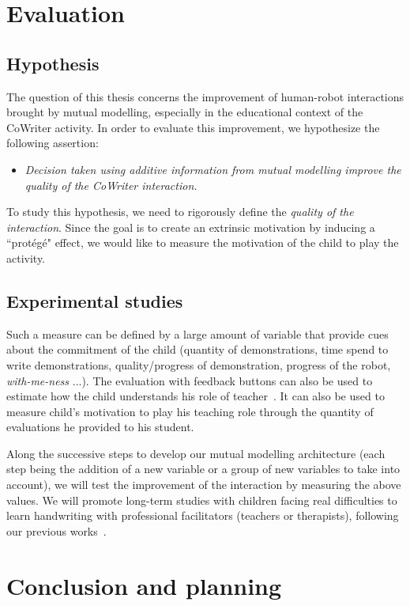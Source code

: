 \documentclass[10pt,a4paper,twocolumn]{article}
\begin{document}
\section{Evaluation}

\subsection{Hypothesis}

The question of this thesis concerns the improvement of human-robot interactions brought by mutual modelling, especially in the educational context of the CoWriter activity. In order to evaluate this improvement, we hypothesize the following assertion:
\begin{itemize}
\item \textit{Decision taken using additive information from mutual modelling improve the quality of the CoWriter interaction.}
\end{itemize}
To study this hypothesis, we need to rigorously define the \textit{quality of the interaction}. Since the goal is to create an extrinsic motivation by inducing a ``prot\'eg\'e" effect, we would like to measure the motivation of the child to play the activity.

\subsection{Experimental studies}

Such a measure can be defined by a large amount of variable that provide cues about the commitment of the child (quantity of demonstrations, time spend to write demonstrations, quality/progress of demonstration, progress of the robot, \textit{with-me-ness} ...). The evaluation with feedback buttons can also be used to estimate how the child understands his role of teacher~\cite{jacq2016building}. It can also be used to measure child's motivation to play his teaching role through the quantity of evaluations he provided to his student. 

Along the successive steps to develop our mutual modelling architecture (each step being the addition of a new variable or a group of new variables to take into account), we will test the improvement of the interaction by measuring the above values. We will promote long-term studies with children facing real difficulties to learn handwriting with professional facilitators (teachers or therapists), following our previous works~\cite{jacq2016building}. 

\section{Conclusion and planning}
\end{document}

